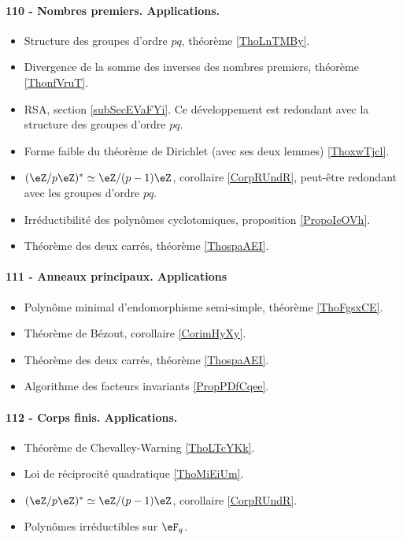 \paragraph{110 - Nombres premiers. Applications.}
\begin{itemize}
    \item Structure des groupes d'ordre \( pq\), théorème \ref{ThoLnTMBy}.
    \item Divergence de la somme des inverses des nombres premiers, théorème \ref{ThonfVruT}.
    \item RSA, section \ref{subSecEVaFYi}. Ce développement est redondant avec la structure des groupes d'ordre \( pq\).
    \item Forme faible du théorème de Dirichlet (avec ses deux lemmes) \ref{ThoxwTjcl}.
    \item \( (\eZ/p\eZ)^*\simeq \eZ/(p-1)\eZ\), corollaire \ref{CorpRUndR}, peut-être redondant avec les groupes d'ordre \( pq\).
    \item Irréductibilité des polynômes cyclotomiques, proposition \ref{PropoIeOVh}.
    \item Théorème des deux carrés, théorème \ref{ThospaAEI}.
\end{itemize}

\paragraph{111 - Anneaux principaux. Applications}
\begin{itemize}
    \item Polynôme minimal d'endomorphisme semi-simple, théorème \ref{ThoFgsxCE}.
    \item Théorème de Bézout, corollaire \ref{CorimHyXy}.
    \item Théorème des deux carrés, théorème \ref{ThospaAEI}.
    \item Algorithme des facteurs invariants \ref{PropPDfCqee}.
\end{itemize}

\paragraph{112 - Corps finis. Applications.}
\begin{itemize}
    \item Théorème de Chevalley-Warning \ref{ThoLTcYKk}.
    \item Loi de réciprocité quadratique \ref{ThoMiEiUm}.
    \item \( (\eZ/p\eZ)^*\simeq \eZ/(p-1)\eZ\), corollaire \ref{CorpRUndR}.
    \item Polynômes irréductibles sur \( \eF_q\).
\end{itemize}

